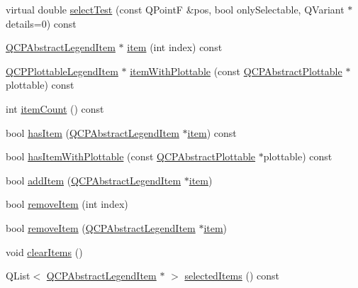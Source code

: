 \begin{DoxyCompactItemize}
\item 
virtual double \hyperlink{class_q_c_p_legend_aa3892801051bc7b985e003576df844db}{select\+Test} (const Q\+Point\+F \&pos, bool only\+Selectable, Q\+Variant $\ast$details=0) const 
\item 
\hyperlink{class_q_c_p_abstract_legend_item}{Q\+C\+P\+Abstract\+Legend\+Item} $\ast$ \hyperlink{class_q_c_p_legend_a454272d7094437beb3278a2294006da5}{item} (int index) const 
\item 
\hyperlink{class_q_c_p_plottable_legend_item}{Q\+C\+P\+Plottable\+Legend\+Item} $\ast$ \hyperlink{class_q_c_p_legend_a5ee80cf83f65e3b6dd386942ee3cc1ee}{item\+With\+Plottable} (const \hyperlink{class_q_c_p_abstract_plottable}{Q\+C\+P\+Abstract\+Plottable} $\ast$plottable) const 
\item 
int \hyperlink{class_q_c_p_legend_a198228e9cdc78d3a3c306fa6763d0404}{item\+Count} () const 
\item 
bool \hyperlink{class_q_c_p_legend_a380dd19eb631592e1ebb9b24cc5b398a}{has\+Item} (\hyperlink{class_q_c_p_abstract_legend_item}{Q\+C\+P\+Abstract\+Legend\+Item} $\ast$\hyperlink{class_q_c_p_legend_a454272d7094437beb3278a2294006da5}{item}) const 
\item 
bool \hyperlink{class_q_c_p_legend_a2eb1d24bdf5658e64962a656303fd61a}{has\+Item\+With\+Plottable} (const \hyperlink{class_q_c_p_abstract_plottable}{Q\+C\+P\+Abstract\+Plottable} $\ast$plottable) const 
\item 
bool \hyperlink{class_q_c_p_legend_a3ab274de52d2951faea45a6d975e6b3f}{add\+Item} (\hyperlink{class_q_c_p_abstract_legend_item}{Q\+C\+P\+Abstract\+Legend\+Item} $\ast$\hyperlink{class_q_c_p_legend_a454272d7094437beb3278a2294006da5}{item})
\item 
bool \hyperlink{class_q_c_p_legend_ac91595c3eaa746fe6321d2eb952c63bb}{remove\+Item} (int index)
\item 
bool \hyperlink{class_q_c_p_legend_a2aea4ec6da2d454dd0b241a254d65082}{remove\+Item} (\hyperlink{class_q_c_p_abstract_legend_item}{Q\+C\+P\+Abstract\+Legend\+Item} $\ast$\hyperlink{class_q_c_p_legend_a454272d7094437beb3278a2294006da5}{item})
\item 
void \hyperlink{class_q_c_p_legend_a24795c7250eb5214fcea16b7217b4dfb}{clear\+Items} ()
\item 
Q\+List$<$ \hyperlink{class_q_c_p_abstract_legend_item}{Q\+C\+P\+Abstract\+Legend\+Item} $\ast$ $>$ \hyperlink{class_q_c_p_legend_ac93eaf236e911d67aa8b88942ef45c5e}{selected\+Items} () const 
\end{DoxyCompactItemize}
